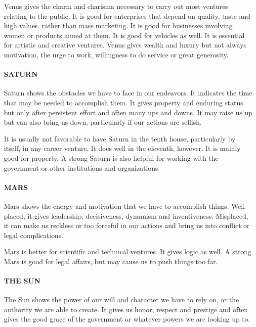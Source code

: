 Venus gives the charm and charisma necessary to carry out most ventures relating to the public. It is good for enterprises that depend on quality, taste and high values, rather than mass marketing. It is good for businesses involving women or products aimed at them. It is good for vehicles as well. It is essential for artistic and creative ventures. Venus gives wealth and luxury but not always motivation, the urge to work, willingness to do service or great generosity.

 

\paragraph{SATURN}

Saturn shows the obstacles we have to face in our endeavors. It indicates the time that may be needed to accomplish them. It gives property and enduring status but only after persistent effort and often many ups and downs. It may raise us up but can also bring us down, particularly if our actions are selfish.

 

It is usually not favorable to have Saturn in the tenth house, particularly by itself, in any career venture. It does well in the eleventh, however. It is mainly good for property. A strong Saturn is also helpful for working with the government or other institutions and organizations.

 

\paragraph{MARS}

Mars shows the energy and motivation that we have to accomplish things. Well placed, it gives leadership, decisiveness, dynamism and inventiveness. Misplaced, it can make us reckless or too forceful in our actions and bring us into conflict or legal complications.

 

Mars is better for scientific and technical ventures. It gives logic as well. A strong Mars is good for legal affairs, but may cause us to push things too far.

 

\paragraph{THE SUN}

The Sun shows the power of our will and character we have to rely on, or the authority we are able to create. It gives us honor, respect and prestige and often gives the good grace of the government or whatever powers we are looking up to.

